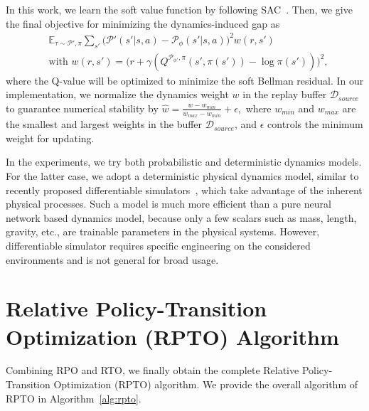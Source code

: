 \documentclass[letterpaper]{article} %
\def\E{{\mathbb{E}}}
\def\P{{\mathcal{P}}}
\begin{document}
In this work, we learn the soft value function by following SAC~\cite{haarnoja2018soft}.
Then, we give the final objective for minimizing the dynamics-induced gap as
{\small
\begin{equation}
\begin{aligned}
&\E_{\tau \sim \P',\pi}
\sum_{s'} 
\big( \P'(s'|s,a)- \P_{\phi}(s'|s,a)\big)^2 w(r, s') 
\\
&\text{with }w(r, s') = \big(
r+\gamma (Q^{\P_{\phi'},\pi}(s', \pi(s')) - \log \pi(s') )
\big)^2,
\end{aligned}    
\label{eq:rto_p2}
\end{equation}
}where the Q-value will be optimized to minimize the soft Bellman residual.
In our implementation, we normalize the dynamics weight $w$ in the replay buffer $\mathcal{D}_{source}$ to guarantee numerical stability by
    $\hat{w} = \frac{w - w_{min} }{w_{max} - w_{min}} + \epsilon,$
where $w_{min}$ and $w_{max}$ are the smallest and largest weights in the buffer $\mathcal{D}_{source}$, 
and $\epsilon$ controls the minimum weight for updating.

In the experiments, we try both probabilistic and deterministic dynamics models. For the latter case, we adopt a deterministic physical dynamics model, similar to recently proposed differentiable  simulators~\citep{hu2020difftaichi,brax2021github,werling2021fast}, which take advantage of the inherent physical processes. Such a model is much more efficient than a pure neural network based dynamics model, because only a few scalars 
such as mass, length, gravity, etc., 
are trainable parameters in the physical systems. However, differentiable  simulator requires specific engineering on the considered environments and is not general for broad usage.



\section{Relative Policy-Transition Optimization (RPTO) Algorithm}
\label{sec:rpto}
Combining RPO and RTO, we finally obtain the complete Relative Policy-Transition Optimization (RPTO) algorithm.
We provide the overall algorithm of RPTO in Algorithm~\ref{alg:rpto}.
\end{document}
